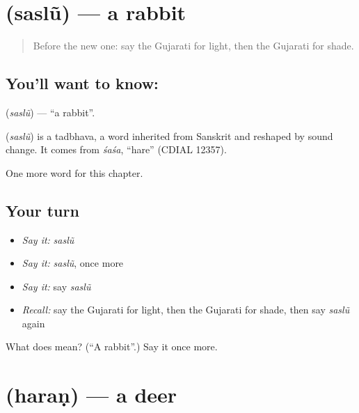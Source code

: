 \section[\texorpdfstring{\gu{સસલું} (saslũ)}{સસલું (saslũ)}]{ (saslũ) — a rabbit}

\label{lesson:GU-C121-saslu}



\begin{quote}
Before the new one: say the Gujarati for light, then the Gujarati for shade.
\end{quote}

\subsection*{You'll want to know: }
\textbf{} (\emph{saslũ}) — \textquotedblleft{}a rabbit\textquotedblright{}.

\begin{cousinweb}
\textbf{} (\emph{saslũ}) is a tadbhava, a word inherited from Sanskrit and reshaped by sound change. It comes from \emph{śaśa}, \textquotedblleft{}hare\textquotedblright{} (CDIAL 12357).
\end{cousinweb}

\begin{grammarlens}[title={What you've built}]
One more word for this chapter.
\end{grammarlens}

\subsection*{Your turn}
\begin{itemize}
\raggedright
  \item \emph{Say it:} \emph{saslũ}
  \item \emph{Say it:} \emph{saslũ}, once more
  \item \emph{Say it:} say \emph{saslũ}
  \item \emph{Recall:} say the Gujarati for light, then the Gujarati for shade, then say \emph{saslũ} again
\end{itemize}

\begin{tcolorbox}[breakable,colback=teal!4,colframe=teal!35!black,title={Before you move on}]
What does  mean? (\textquotedblleft{}A rabbit\textquotedblright{}.) Say it once more.
\end{tcolorbox}
\section[\texorpdfstring{\gu{હરણ} (haraṇ)}{હરણ (haraṇ)}]{ (haraṇ) — a deer}

